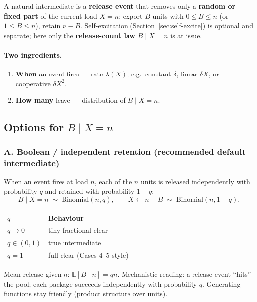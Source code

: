 \documentclass[11pt,a4paper]{article}
\newcommand{\E}{\mathbb{E}}
\theoremstyle{plain}
\theoremstyle{definition}
\theoremstyle{remark}
\begin{document}
A natural intermediate is a \textbf{release event} that removes only a
\textbf{random or fixed part} of the current load $X=n$: export $B$ units with
$0\le B\le n$ (or $1\le B\le n$), retain $n-B$. Self-excitation
(Section~\ref{sec:self-excite}) is optional and separate; here only the
\textbf{release-count law} $B\mid X=n$ is at issue.

\paragraph{Two ingredients.}
\begin{enumerate}
\item \textbf{When} an event fires --- rate $\lambda(X)$, e.g.\ constant
$\delta$, linear $\delta X$, or cooperative $\delta X^2$.
\item \textbf{How many} leave --- distribution of $B\mid X=n$.
\end{enumerate}

\subsection{Options for $B\mid X=n$}

\subsubsection*{A. Boolean / independent retention (recommended default intermediate)}

When an event fires at load $n$, each of the $n$ units is released independently
with probability $q$ and retained with probability $1-q$:
\begin{equation}
\label{eq:boolean-B}
B\mid X=n \;\sim\; \mathrm{Binomial}(n,q),
\qquad
X \leftarrow n-B \;\sim\; \mathrm{Binomial}(n,1-q).
\end{equation}
\begin{center}
\renewcommand{\arraystretch}{1.15}
\begin{tabular}{@{}ll@{}}
\toprule
$q$ & Behaviour \\
\midrule
$q\to 0$ & tiny fractional clear \\
$q\in(0,1)$ & true intermediate \\
$q=1$ & full clear (Cases 4--5 style) \\
\bottomrule
\end{tabular}
\end{center}
Mean release given $n$: $\E[B\mid n]=qn$. Mechanistic reading: a release event
``hits'' the pool; each package succeeds independently with probability $q$.
Generating functions stay friendly (product structure over units).
\end{document}
